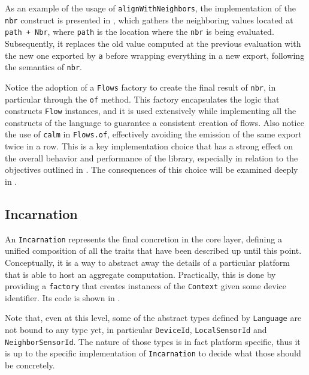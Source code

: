 As an example of the usage of \texttt{alignWithNeighbors}, the implementation of the \texttt{nbr} construct is presented in , which gathers the neighboring values located at \texttt{path + Nbr}, where \texttt{path} is the location where the \texttt{nbr} is being evaluated.
%
Subsequently, it replaces the old value computed at the previous evaluation with the new one exported by \texttt{a} before wrapping everything in a new export, following the semantics of \texttt{nbr}.
%

%
Notice the adoption of a \texttt{Flows} factory to create the final result of \texttt{nbr}, in particular through the \texttt{of} method.
%
This factory encapsulates the logic that constructs \texttt{Flow} instances, and it is used extensively while implementing all the constructs of the language to guarantee a consistent creation of flows.
%
Also notice the use of \texttt{calm} in \texttt{Flows.of}, effectively avoiding the emission of the same export twice in a row.
%
This is a key implementation choice that has a strong effect on the overall behavior and performance of the library, especially in relation to the objectives outlined in .
%
The consequences of this choice will be examined deeply in .

\subsection{Incarnation}

An \texttt{Incarnation} represents the final concretion in the core layer, defining a unified composition of all the traits that have been described up until this point.
%
Conceptually, it is a way to abstract away the details of a particular platform that is able to host an aggregate computation.
%
Practically, this is done by providing a \texttt{factory} that creates instances of the \texttt{Context} given some device identifier.
%
Its code is shown in .
%


Note that, even at this level, some of the abstract types defined by \texttt{Language} are not bound to any type yet, in particular \texttt{DeviceId}, \texttt{LocalSensorId} and \texttt{NeighborSensorId}.
%
The nature of those types is in fact platform specific, thus it is up to the specific implementation of \texttt{Incarnation} to decide what those should be concretely.


